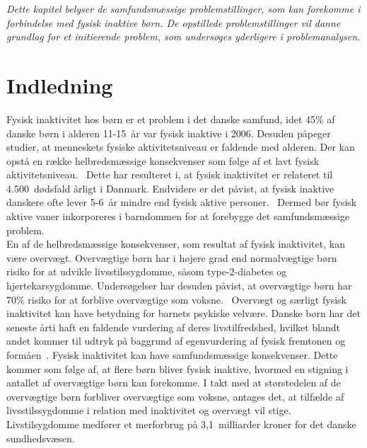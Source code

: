 \textit{Dette kapitel belyser de samfundsmæssige problemstillinger, som kan forekomme i forbindelse med fysisk inaktive børn. De opstillede problemstillinger vil danne grundlag for et initierende problem, som undersøges yderligere i problemanalysen.}

\section{Indledning}
Fysisk inaktivitet hos børn er et problem i det danske samfund, idet 45\% af danske børn i alderen 11-15~år var fysisk inaktive i 2006. Desuden påpeger studier, at menneskets fysiske aktivitetsniveau er faldende med alderen. Der kan opstå en række helbredsmæssige konsekvenser som følge af et lavt fysisk aktivitetsniveau.~\citep{Sundhedsstyrelsen2006} Dette har resulteret i, at fysisk inaktivitet er relateret til 4.500~dødsfald årligt i Danmark. Endvidere er det påvist, at fysisk inaktive danskere ofte lever 5-6~år mindre end fysisk aktive personer.~\citep{JuelSoerensenBroennum-Hansen2006} Dermed bør fysisk aktive vaner inkorporeres i barndommen for at forebygge det samfundsmæssige problem.\\ %
En af de helbredsmæssige konsekvenser, som resultat af fysisk inaktivitet, kan være overvægt. Overvægtige børn har i højere grad end normalvægtige børn risiko for at udvikle livsstilssygdomme, såsom type-2-diabetes og hjertekarsygdomme. Undersøgelser har desuden påvist, at overvægtige børn har 70\% risiko for at forblive overvægtige som voksne.~\citep{Reilly2006} Overvægt og særligt fysisk inaktivitet kan have betydning for barnets psykiske velvære. Danske børn har det seneste årti haft en faldende vurdering af deres livstilfredshed, hvilket blandt andet kommer til udtryk på baggrund af egenvurdering af fysisk fremtonen og formåen~\citep{Universitet2014,StatensInstitutforFolkesundhed2007}. \newline
Fysisk inaktivitet kan have samfundsmæssige konsekvenser. Dette kommer som følge af, at flere børn bliver fysisk inaktive, hvormed en stigning i antallet af overvægtige børn kan forekomme. I takt med at størstedelen af de overvægtige børn forbliver overvægtige som voksne, antages det, at tilfælde af livsstilssygdomme i relation med inaktivitet og overvægt vil stige. Livstilsygdomme medfører et merforbrug på 3,1~milliarder kroner for det danske sundhedsvæsen.~\citep{JuelSoerensenBroennum-Hansen2006}

